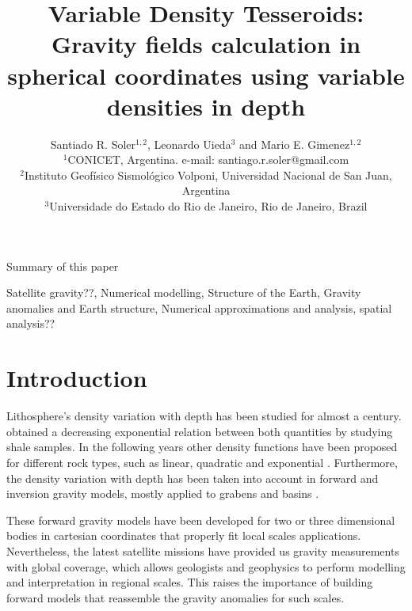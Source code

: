 \documentclass[extra]{gji}
\begin{document}
\title[Variable Density Tesseroids]{
    Variable Density Tesseroids: Gravity fields calculation in spherical coordinates using variable densities in depth
}
\author[S.R. Soler, L. Uieda and M.E. Gimenez]{
    Santiado R. Soler$^{1,2}$, Leonardo Uieda$^3$ and Mario E. Gimenez$^{1,2}$ \\
    $^1$CONICET, Argentina. e-mail: santiago.r.soler@gmail.com\\
    $^2$Instituto Geofísico Sismológico Volponi, Universidad Nacional de San Juan, Argentina\\
    $^3$Universidade do Estado do Rio de Janeiro, Rio de Janeiro, Brazil
    }


\maketitle

\begin{summary}
Summary of this paper 
\end{summary}

\begin{keywords}
Satellite gravity??, Numerical modelling, Structure of the Earth, Gravity anomalies and Earth structure, Numerical approximations and analysis, spatial analysis??
\end{keywords}


\section{Introduction}

Lithosphere's density variation with depth has been studied for almost a century. 
\citet{Athy1930} obtained a decreasing exponential relation between both quantities by studying shale samples.
In the following years other density functions have been proposed for different rock types, such as linear, quadratic and exponential \citep[e.g.,][]{Maxant1980, Rao1986, Rao1993, Rao1994}.
Furthermore, the density variation with depth has been taken into account in forward and inversion gravity models, mostly applied to grabens and basins \citep{Cordell1973, Rao1986, Cowie1990, Rao1993, Rao1994, Zhang2001, Welford2010}.

These forward gravity models have been developed for two or three dimensional bodies in cartesian coordinates that properly fit local scales applications.
Nevertheless, the latest satellite missions have provided us gravity measurements with global coverage, which allows geologists and geophysics to perform modelling and interpretation in regional scales.
This raises the importance of building forward models that reassemble the gravity anomalies for such scales.
\end{document}
